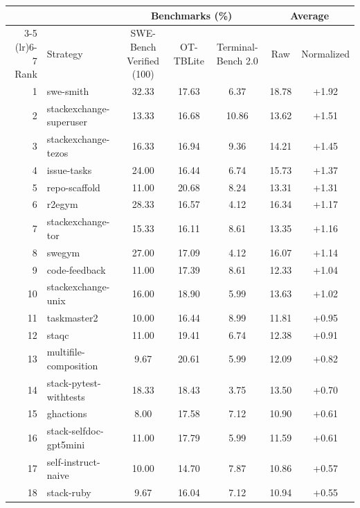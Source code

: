 \documentclass{article}
\begin{document}
\begin{table}[!htbp]
\centering
\footnotesize
\setlength{\tabcolsep}{4pt}
\begin{tabular}{rlccccc}
\toprule
 & & \multicolumn{3}{c}{Benchmarks (\%)} & \multicolumn{2}{c}{Average} \\
\cmidrule(lr){3-5} \cmidrule(lr){6-7}
Rank & Strategy & SWE-Bench Verified (100) & OT-TBLite & Terminal-Bench 2.0 & Raw & Normalized \\
\midrule
1  & swe-smith                       & 32.33 & 17.63 &  6.37 & 18.78 & +1.92 \\
2  & stackexchange-superuser        & 13.33 & 16.68 & 10.86 & 13.62 & +1.51 \\
3  & stackexchange-tezos            & 16.33 & 16.94 &  9.36 & 14.21 & +1.45 \\
4  & issue-tasks                    & 24.00 & 16.44 &  6.74 & 15.73 & +1.37 \\
5  & repo-scaffold                  & 11.00 & 20.68 &  8.24 & 13.31 & +1.31 \\
6  & r2egym                         & 28.33 & 16.57 &  4.12 & 16.34 & +1.17 \\
7  & stackexchange-tor              & 15.33 & 16.11 &  8.61 & 13.35 & +1.16 \\
8  & swegym                         & 27.00 & 17.09 &  4.12 & 16.07 & +1.14 \\
9  & code-feedback                  & 11.00 & 17.39 &  8.61 & 12.33 & +1.04 \\
10 & stackexchange-unix             & 16.00 & 18.90 &  5.99 & 13.63 & +1.02 \\
11 & taskmaster2                    & 10.00 & 16.44 &  8.99 & 11.81 & +0.95 \\
12 & staqc                          & 11.00 & 19.41 &  6.74 & 12.38 & +0.91 \\
13 & multifile-composition          &  9.67 & 20.61 &  5.99 & 12.09 & +0.82 \\
14 & stack-pytest-withtests         & 18.33 & 18.43 &  3.75 & 13.50 & +0.70 \\
15 & ghactions                      &  8.00 & 17.58 &  7.12 & 10.90 & +0.61 \\
16 & stack-selfdoc-gpt5mini         & 11.00 & 17.79 &  5.99 & 11.59 & +0.61 \\
17 & self-instruct-naive            & 10.00 & 14.70 &  7.87 & 10.86 & +0.57 \\
18 & stack-ruby                     &  9.67 & 16.04 &  7.12 & 10.94 & +0.55 \\

\end{tabular}
\end{table}
\end{document}

